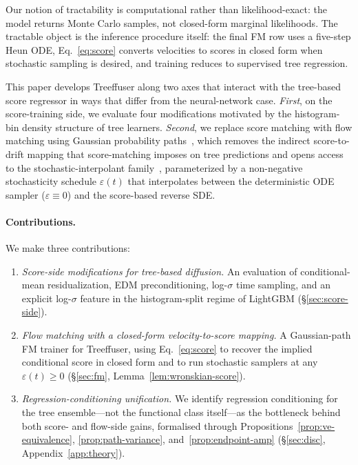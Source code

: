 \documentclass{tpm2026}
\begin{document}
Our notion of tractability is computational rather than likelihood-exact: the model returns Monte Carlo samples, not closed-form marginal likelihoods. The tractable object is the inference procedure itself: the final FM row uses a five-step Heun ODE, Eq.~\eqref{eq:score} converts velocities to scores in closed form when stochastic sampling is desired, and training reduces to supervised tree regression.

This paper develops Treeffuser along two axes that interact with the tree-based score regressor in ways that differ from the neural-network case. \emph{First}, on the score-training side, we evaluate four modifications motivated by the histogram-bin density structure of tree learners. \emph{Second}, we replace score matching with flow matching using Gaussian probability paths~\citep{lipman2023flow,liu2023rectified}, which removes the indirect score-to-drift mapping that score-matching imposes on tree predictions and opens access to the stochastic-interpolant family~\citep{albergo2023stochastic}, parameterized by a non-negative stochasticity schedule $\varepsilon(t)$ that interpolates between the deterministic ODE sampler ($\varepsilon \equiv 0$) and the score-based reverse SDE.

\paragraph{Contributions.} We make three contributions:
\begin{enumerate}
  \item \emph{Score-side modifications for tree-based diffusion.} An evaluation of conditional-mean residualization, EDM preconditioning, log-$\sigma$ time sampling, and an explicit log-$\sigma$ feature in the histogram-split regime of LightGBM (\S\ref{sec:score-side}).
  \item \emph{Flow matching with a closed-form velocity-to-score mapping.} A Gaussian-path FM trainer for Treeffuser, using Eq.~\eqref{eq:score} to recover the implied conditional score in closed form and to run stochastic samplers at any $\varepsilon(t)\geq 0$ (\S\ref{sec:fm}, Lemma~\ref{lem:wronskian-score}).
  \item \emph{Regression-conditioning unification.} We identify regression conditioning for the tree ensemble---not the functional class itself---as the bottleneck behind both score- and flow-side gains, formalised through Propositions~\ref{prop:ve-equivalence}, \ref{prop:path-variance}, and~\ref{prop:endpoint-amp} (\S\ref{sec:disc}, Appendix~\ref{app:theory}).
\end{enumerate}
\end{document}
